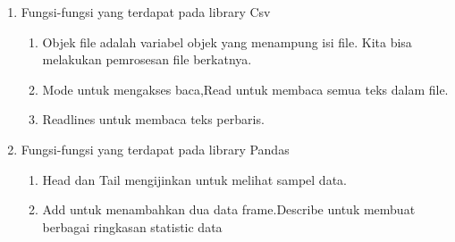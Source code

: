 \begin{enumerate}
\item{Fungsi-fungsi yang terdapat pada library Csv}

\begin{enumerate}
\item Objek file adalah variabel objek yang menampung isi file. Kita bisa melakukan pemrosesan file berkatnya.
\item Mode untuk mengakses baca,Read untuk membaca semua  teks dalam file.
\item Readlines untuk membaca teks perbaris.
	\end{enumerate}


\item{Fungsi-fungsi yang terdapat pada library Pandas}

\begin{enumerate}
\item Head dan Tail mengijinkan  untuk  melihat sampel data.
\item Add untuk menambahkan dua data frame.Describe untuk membuat  berbagai ringkasan statistic data
\end{enumerate}


\end{enumerate}


